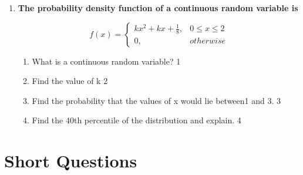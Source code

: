 \documentclass[a4paper,oneside]{book}
\begin{document}
\begin{enumerate}
 \item
  \textbf{The probability density function of a continuous random variable is}

$$
  f(x) =
\begin{cases}
kx^2+kx+ \frac 18,  & 0 \le x \le 2 \\
0, & otherwise
\end{cases}
$$

  \begin{enumerate}
    \item
	What is a continuous random variable? \hfill 1
    \item
    	Find the value of k \hfill 2
    \item
    	Find the probability that the values of x would lie between1 and 3. \hfill 3
     \item
     	Find the 40th percentile of the distribution and explain.  \hfill 4
  \end{enumerate}
  \end{enumerate}

\section{Short Questions}
\end{document}
